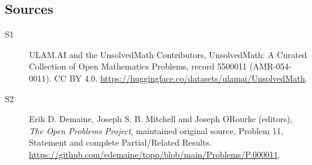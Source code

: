 \documentclass[11pt]{article}
\begin{document}
\subsection{Sources}
\begin{description}
\item[\hypertarget{source:5500011:1}{S1}] ULAM.AI and the UnsolvedMath Contributors, UnsolvedMath: A Curated Collection of Open Mathematics Problems, record 5500011 (AMR-054-0011). CC BY 4.0. \url{https://huggingface.co/datasets/ulamai/UnsolvedMath}.
\item[\hypertarget{source:5500011:2}{S2}] Erik D. Demaine, Joseph S. B. Mitchell and Joseph O\textquotesingle Rourke (editors), \emph{The Open Problems Project}, maintained original source, Problem 11, Statement and complete Partial/Related Results. \url{https://github.com/edemaine/topp/blob/main/Problems/P.000011}.
\end{description}
\label{end:5500011}
\end{document}
